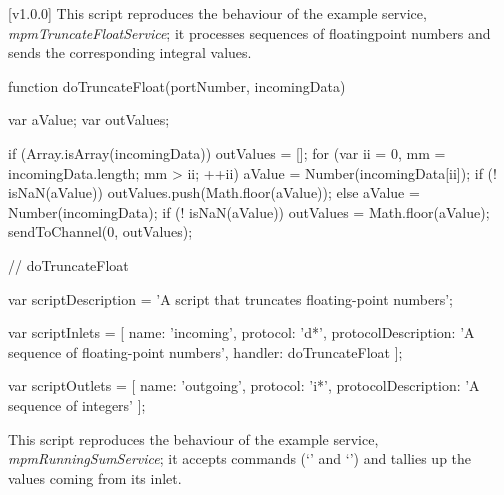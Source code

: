 [v1.0.0]
%
This script reproduces the behaviour of the example service,
\emph{mpmTruncateFloatService}; it processes sequences of floating\longDash{}point numbers
and sends the corresponding integral values.\\

\codeBegin{}
\begin{listing}[5]{1}
function doTruncateFloat(portNumber, incomingData)
{
    var aValue;
    var outValues;
    
    if (Array.isArray(incomingData))
    {
        outValues = [];
        for (var ii = 0, mm = incomingData.length; mm > ii; ++ii)
        {
            aValue = Number(incomingData[ii]);
            if (! isNaN(aValue))
            {
                outValues.push(Math.floor(aValue));
            }
        }
    }
    else
    {
        aValue = Number(incomingData);
        if (! isNaN(aValue))
        {
            outValues = Math.floor(aValue);
        }
    }
    sendToChannel(0, outValues);
} // doTruncateFloat

var scriptDescription = 'A script that truncates floating-point numbers';

var scriptInlets = [ { name: 'incoming', protocol: 'd*',
                        protocolDescription: 'A sequence of floating-point numbers',
                        handler: doTruncateFloat } ];

var scriptOutlets = [ { name: 'outgoing', protocol: 'i*',
                        protocolDescription: 'A sequence of integers' } ];
\end{listing}
\codeEnd{}
\secondaryEnd{}
\condPage{}
This script reproduces the behaviour of the example service,
\emph{mpmRunningSumService}; it accepts commands (`' and
`') and tallies up the values coming from its inlet.\\

